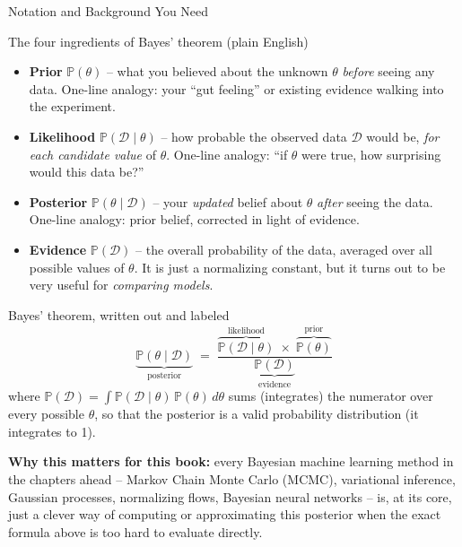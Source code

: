 \documentclass[aspectratio=169,10pt]{beamer}
\newcommand{\Prob}{\mathbb{P}}
\newcommand{\thetav}{\theta}
\newcommand{\Data}{\mathcal{D}}
\begin{document}
\begin{frame}[allowframebreaks]{Notation and Background You Need}
  \begin{block}{The four ingredients of Bayes' theorem (plain English)}
    \begin{itemize}
      \item \textbf{Prior} $\Prob(\thetav)$ -- what you believed about the
      unknown $\thetav$ \emph{before} seeing any data. One-line analogy:
      your ``gut feeling'' or existing evidence walking into the experiment.
      \item \textbf{Likelihood} $\Prob(\Data \mid \thetav)$ -- how probable
      the observed data $\Data$ would be, \emph{for each candidate value} of
      $\thetav$. One-line analogy: ``if $\thetav$ were true, how surprising
      would this data be?''
      \item \textbf{Posterior} $\Prob(\thetav \mid \Data)$ -- your
      \emph{updated} belief about $\thetav$ \emph{after} seeing the data.
      One-line analogy: prior belief, corrected in light of evidence.
      \item \textbf{Evidence} $\Prob(\Data)$ -- the overall probability of
      the data, averaged over all possible values of $\thetav$. It is just a
      normalizing constant, but it turns out to be very useful for
      \emph{comparing models}.
    \end{itemize}
  \end{block}

  \framebreak

  \begin{block}{Bayes' theorem, written out and labeled}
    \[
      \underbrace{\Prob(\thetav \mid \Data)}_{\text{posterior}}
      \;=\;
      \frac{\overbrace{\Prob(\Data \mid \thetav)}^{\text{likelihood}}
      \;\times\;
      \overbrace{\Prob(\thetav)}^{\text{prior}}}
      {\underbrace{\Prob(\Data)}_{\text{evidence}}}
    \]
    where $\Prob(\Data) = \int \Prob(\Data \mid \thetav)\, \Prob(\thetav)\, d\thetav$
    sums (integrates) the numerator over every possible $\thetav$, so that
    the posterior is a valid probability distribution (it integrates to 1).
  \end{block}

  \textbf{Why this matters for this book:} every Bayesian machine learning
  method in the chapters ahead -- Markov Chain Monte Carlo (MCMC),
  variational inference, Gaussian processes, normalizing flows, Bayesian
  neural networks -- is, at its core, just a clever way of computing or
  approximating this posterior when the exact formula above is too hard to
  evaluate directly.
\end{frame}
\end{document}
